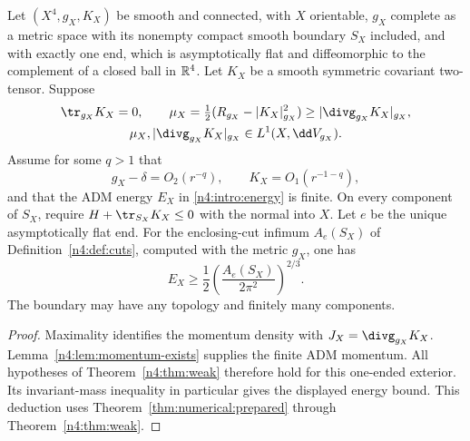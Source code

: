 \begin{corollary}
\label{n4:cor:maximal-dec}\label{n4:ass:energy}
Let $(X^4,g_X,K_X)$ be smooth and connected, with $X$ orientable,
$g_X$ complete as a metric space with its nonempty compact smooth
boundary $S_X$ included, and with exactly one end, which is asymptotically
flat and diffeomorphic to the complement of a closed ball in $\mathbb R^4$.
Let $K_X$ be a smooth symmetric covariant two-tensor. Suppose
\[
\begin{gathered}
 \tr_{g_X}K_X=0,\qquad
 \mu_X=\tfrac12(R_{g_X}-|K_X|_{g_X}^2)
       \ge|\divg_{g_X}K_X|_{g_X},\\
 \mu_X,|\divg_{g_X}K_X|_{g_X}\in L^1(X,\dd V_{g_X}).
\end{gathered}
\]
Assume for some $q>1$ that
\[
 g_X-\delta=O_2(r^{-q}),\qquad K_X=O_1(r^{-1-q}),
\]
and that the ADM energy $E_X$ in \eqref{n4:intro:energy} is finite.
On every component of $S_X$, require
$H+\tr_{S_X}K_X\le0$ with the normal into $X$.
Let $e$ be the unique asymptotically flat end. For the enclosing-cut
infimum $A_e(S_X)$ of Definition~\ref{n4:def:cuts}, computed with the
metric $g_X$, one has
\[
 E_X\ge\frac12\left(\frac{A_e(S_X)}{2\pi^2}\right)^{2/3}.
\]
The boundary may have any topology and finitely many components.
\end{corollary}

\begin{proof}
Maximality identifies the momentum density with
$J_X=\divg_{g_X}K_X$. Lemma~\ref{n4:lem:momentum-exists} supplies
the finite ADM momentum. All hypotheses of
Theorem~\ref{n4:thm:weak} therefore hold for this one-ended exterior.
Its invariant-mass inequality in particular gives the displayed
energy bound. This deduction uses Theorem~\ref{thm:numerical:prepared}
through Theorem~\ref{n4:thm:weak}.
\end{proof}

